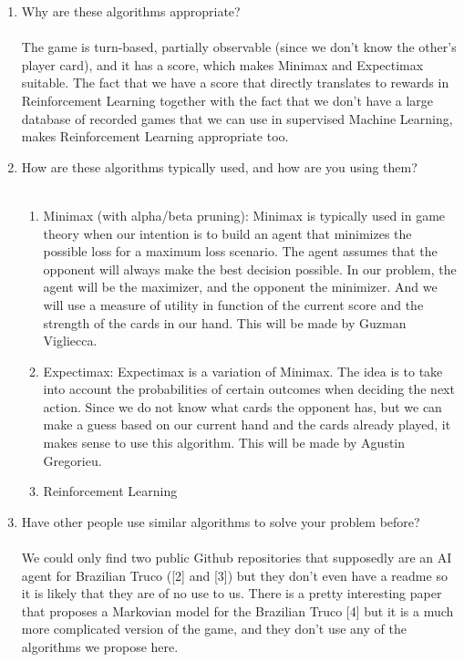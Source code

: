 \documentclass{article}
\begin{document}
\begin{enumerate}
\item Why are these algorithms appropriate?
\\\\
The game is turn-based, partially observable (since we don’t know the other’s player card), and it has a score, which makes Minimax and Expectimax suitable. The fact that we have a score that directly translates to rewards in Reinforcement Learning together with the fact that we don’t have a large database of recorded games that we can use in supervised Machine Learning, makes Reinforcement Learning appropriate too.

\item How are these algorithms typically used, and how are you using them?
\\\\
\begin{enumerate}
	\item Minimax (with alpha/beta pruning): Minimax is typically used in game theory when our intention is to build an agent that minimizes the possible loss for a maximum loss scenario. The agent assumes that the opponent will always make the best decision possible. In our problem, the agent will be the maximizer, and the opponent the minimizer. And we will use a measure of utility in function of the current score and the strength of the cards in our hand. This will be made by Guzman Vigliecca.
	\item Expectimax: Expectimax is a variation of Minimax. The idea is to take into account the probabilities of certain outcomes when deciding the next action. Since we do not know what cards the opponent has, but we can make a guess based on our current hand and the cards already played, it makes sense to use this algorithm. This will be made by Agustin Gregorieu.
	\item Reinforcement Learning
\end{enumerate}

\item Have other people use similar algorithms to solve your problem before?
\\\\
We could only find two public Github repositories that supposedly are an AI agent for Brazilian Truco ([2] and [3]) but they don’t even have a readme so it is likely that they are of no use to us. There is a pretty interesting paper that proposes a Markovian model for the Brazilian Truco [4] but it is a much more complicated version of the game, and they don’t use any of the algorithms we propose here.


\end{enumerate}
\end{document}
